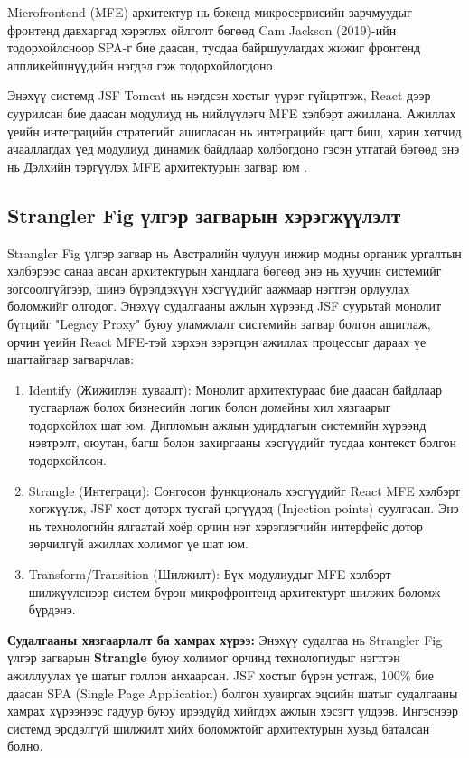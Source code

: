 Microfrontend (MFE) архитектур нь бэкенд микросервисийн зарчмуудыг
фронтенд давхаргад хэрэглэх ойлголт бөгөөд Cam Jackson (2019)-ийн
тодорхойлсноор SPA-г бие даасан, тусдаа байршуулагдах
жижиг фронтенд аппликейшнүүдийн нэгдэл гэж тодорхойлогдоно.

Энэхүү системд JSF Tomcat нь нэгдсэн хостыг
үүрэг гүйцэтгэж, React дээр суурилсан бие даасан модулиуд нь нийлүүлэгч MFE хэлбэрт ажиллана. Ажиллах үеийн интеграцийн стратегийг ашигласан нь интеграцийн цагт биш,
харин хөтчид ачааллагдах үед модулиуд динамик байдлаар холбогдоно
гэсэн утгатай бөгөөд энэ нь Дэлхийн тэргүүлэх MFE архитектурын загвар
юм \cite{mezzalira2021}.


\subsection{Strangler Fig үлгэр загварын хэрэгжүүлэлт}
Strangler Fig үлгэр загвар \cite{fowler_strangler} нь Австралийн чулуун инжир модны органик ургалтын хэлбэрээс санаа авсан архитектурын хандлага бөгөөд энэ нь хуучин системийг зогсоолгүйгээр, шинэ бүрэлдэхүүн хэсгүүдийг аажмаар нэгтгэн орлуулах боломжийг олгодог. Энэхүү судалгааны ажлын хүрээнд JSF суурьтай монолит бүтцийг "Legacy Proxy" буюу уламжлалт системийн загвар болгон ашиглаж, орчин үеийн React MFE-тэй хэрхэн зэрэгцэн ажиллах процессыг дараах үе шаттайгаар загварчлав:

\begin{enumerate}
	\item Identify (Жижиглэн хуваалт): Монолит архитектураас бие даасан байдлаар тусгаарлаж болох бизнесийн логик болон домейны хил хязгаарыг тодорхойлох шат юм. Дипломын ажлын удирдлагын системийн хүрээнд нэвтрэлт, оюутан, багш болон захиргааны хэсгүүдийг тусдаа контекст болгон тодорхойлсон.
	\item Strangle (Интеграци): Сонгосон функциональ хэсгүүдийг React MFE хэлбэрт хөгжүүлж, JSF хост доторх тусгай цэгүүдэд (Injection points) суулгасан. Энэ нь технологийн ялгаатай хоёр орчин нэг хэрэглэгчийн интерфейс дотор зөрчилгүй ажиллах холимог үе шат юм.
	\item Transform/Transition (Шилжилт): Бүх модулиудыг MFE хэлбэрт шилжүүлснээр систем бүрэн микрофронтенд архитектурт шилжих боломж бүрдэнэ.
\end{enumerate}

\textbf{Судалгааны хязгаарлалт ба хамрах хүрээ:} Энэхүү судалгаа нь Strangler Fig үлгэр загварын \textbf{Strangle} буюу холимог орчинд технологиудыг нэгтгэн ажиллуулах үе шатыг голлон анхаарсан. JSF хостыг бүрэн устгаж, 100\% бие даасан SPA (Single Page Application) болгон хувиргах эцсийн шатыг судалгааны хамрах хүрээнээс гадуур буюу ирээдүйд хийгдэх ажлын хэсэгт үлдээв. Ингэснээр системд эрсдэлгүй шилжилт хийх боломжтойг архитектурын хувьд баталсан болно.
